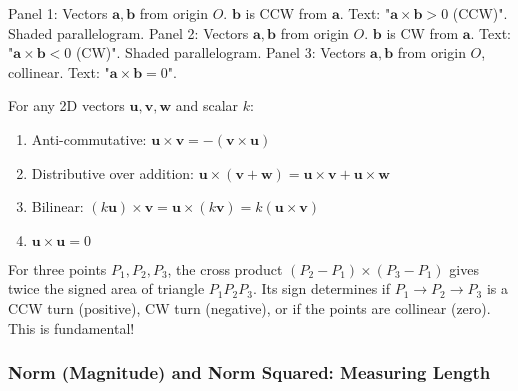\begin{visualexample}
\label{vis:A.1.1.cross_product_2d_cases}
Panel 1: Vectors $\mathbf{a}, \mathbf{b}$ from origin $O$. $\mathbf{b}$ is CCW from $\mathbf{a}$. Text: "$\mathbf{a} \times \mathbf{b} > 0$ (CCW)". Shaded parallelogram.
Panel 2: Vectors $\mathbf{a}, \mathbf{b}$ from origin $O$. $\mathbf{b}$ is CW from $\mathbf{a}$. Text: "$\mathbf{a} \times \mathbf{b} < 0$ (CW)". Shaded parallelogram.
Panel 3: Vectors $\mathbf{a}, \mathbf{b}$ from origin $O$, collinear. Text: "$\mathbf{a} \times \mathbf{b} = 0$".
\end{visualexample}

\begin{theorem}
\label{thm:A.1.1.cross_product_props}
For any 2D vectors $\mathbf{u}, \mathbf{v}, \mathbf{w}$ and scalar $k$:
\begin{enumerate}
    \item Anti-commutative: $\mathbf{u} \times \mathbf{v} = -(\mathbf{v} \times \mathbf{u})$
    \item Distributive over addition: $\mathbf{u} \times (\mathbf{v} + \mathbf{w}) = \mathbf{u} \times \mathbf{v} + \mathbf{u} \times \mathbf{w}$
    \item Bilinear: $(k\mathbf{u}) \times \mathbf{v} = \mathbf{u} \times (k\mathbf{v}) = k(\mathbf{u} \times \mathbf{v})$
    \item $\mathbf{u} \times \mathbf{u} = 0$
\end{enumerate}
\end{theorem}

\begin{mathinsight}
\label{mathinsight:A.1.1.cross_product_3points}
For three points $P_1, P_2, P_3$, the cross product $(P_2 - P_1) \times (P_3 - P_1)$ gives twice the signed area of triangle $P_1P_2P_3$. Its sign determines if $P_1 \to P_2 \to P_3$ is a CCW turn (positive), CW turn (negative), or if the points are collinear (zero). This is fundamental!
\end{mathinsight}

\subsubsection{Norm (Magnitude) and Norm Squared: Measuring Length}
\label{sssec:A.1.1.5}

